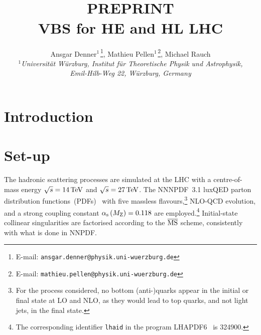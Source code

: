 \documentclass[11pt,epsf]{article}
\begin{document}
\title{\hfill ~\\[-30mm]
\phantom{h} \hfill\mbox{\small PREPRINT}
\\[1cm]
\vspace{13mm}   \textbf{VBS for HE and HL LHC}}

\date{}
\author{
Ansgar Denner$^{1\,}$\footnote{E-mail:
  \texttt{ansgar.denner@physik.uni-wuerzburg.de}},
Mathieu Pellen$^{1\,}$\footnote{E-mail:
  \texttt{mathieu.pellen@physik.uni-wuerzburg.de}},
Michael Rauch
\\[9mm]
{\small\it
$^1$Universit\"at W\"urzburg, %
        Institut f\"ur Theoretische Physik und Astrophysik,} \\ %
{\small\it Emil-Hilb-Weg 22,  W\"urzburg, %
        Germany}\\[3mm]
}

\maketitle

\begin{abstract}
\noindent

\end{abstract}
\thispagestyle{empty}
\vfill
\newpage
\setcounter{page}{1}

\tableofcontents
\newpage


\section{Introduction}


\section{Set-up}

The hadronic scattering processes are simulated at the LHC with a centre-of-mass energy $\sqrt s = 14 \,\text{TeV}$ and $\sqrt s = 27 \,\text{TeV}$.
    The NNNPDF~3.1 luxQED parton distribution functions~(PDFs)~\cite{Bertone:2017bme} with five massless flavours,\footnote{For the process considered, no bottom (anti-)quarks appear in the initial or final state at LO and NLO, as they would lead to top quarks, and not light jets, in the final state.} 
    NLO-QCD evolution, and a strong coupling constant $\alpha_\text{s}\left( M_\text{Z} \right) = 0.118$ are employed.\footnote{The corresponding identifier {\tt lhaid} in the program LHAPDF6~\cite{Buckley:2014ana} is 324900.}
    Initial-state collinear singularities are factorised according to the ${\overline{\rm MS}}$ scheme, consistently with what is done in NNPDF.
\end{document}
